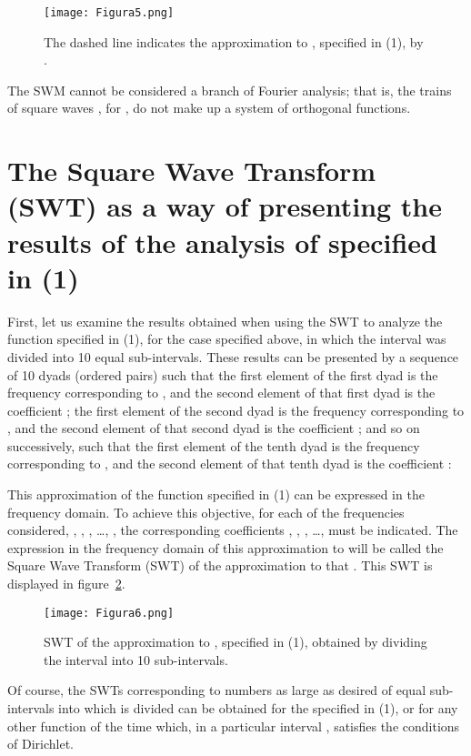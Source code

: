 \documentclass[11pt]{rMTA2010} \usepackage[utf8]{inputenc} \usepackage{graphicx} \usepackage{booktabs} \usepackage{array} \usepackage{enumerate}
\begin{document}
\begin{figure}[H]
\centering
\texttt{[image: Figura5.png]}
\caption{The dashed line indicates the approximation to , specified in (1), by .}
\label{f5}
\end{figure}

The SWM cannot be considered a branch of Fourier analysis; that is, the trains of square waves , for , do not make up a system of orthogonal functions.

\section{The Square Wave Transform (SWT) as a way of presenting the results of the analysis of  specified in (1)}

First, let us examine the results obtained when using the SWT to analyze the function  specified in (1), for the case specified above, in which the interval  was divided into 10 equal sub-intervals. These results can be presented by a sequence of 10 dyads (ordered pairs) such that the first element of the first dyad is the frequency  corresponding to , and the second element of that first dyad is the coefficient ; the first element of the second dyad is the frequency  corresponding to , and the second element of that second dyad is the coefficient ; and so on successively, such that the first element of the tenth dyad is the frequency  corresponding to , and the second element of that tenth dyad is the coefficient :




This approximation of the function  specified in (1) can be expressed in the frequency domain. To achieve this objective, for each of the frequencies considered, , , , \ldots, , the corresponding coefficients , , , \ldots,  must be indicated. The expression in the frequency domain of this approximation to  will be called the Square Wave Transform (SWT) of the approximation to that . This SWT is displayed in figure~\ref{f6}.

\begin{figure}[H]
\centering
\texttt{[image: Figura6.png]}
\caption{SWT of the approximation to , specified in (1), obtained by dividing the interval  into 10 sub-intervals.}
\label{f6}
\end{figure}

Of course, the SWTs corresponding to numbers as large as desired of equal sub-intervals into which  is divided can be obtained for the  specified in (1), or for any other function of the time which, in a particular interval , satisfies the conditions of Dirichlet.
\end{document}
